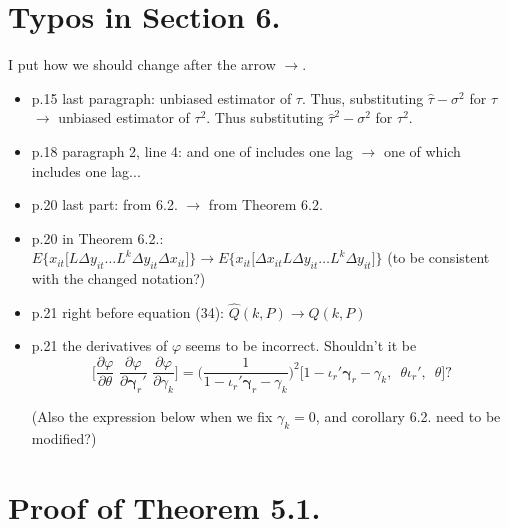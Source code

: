 \documentclass[11pt]{article}
\begin{document}



\doublespacing



\section*{Typos in Section 6.}

I put how we should change after the arrow $\rightarrow$. 

\begin{itemize}
\item p.15 last paragraph: unbiased estimator of $\tau$. Thus, substituting $\widehat{\tau}-\sigma^2$ for $\tau$ $\rightarrow$ unbiased estimator of $\tau^2$. Thus substituting $\widehat{\tau}^2-\sigma^2$ for $\tau^2$. 
\item p.18 paragraph 2, line 4: and one of includes one lag $\rightarrow$ one of which includes one lag...
\item p.20 last part: from 6.2. $\rightarrow$ from Theorem 6.2.
\item p.20 in Theorem 6.2.: $E\big\{ x_{it} \big[ L\Delta y_{it} \ldots L^k \Delta y_{it} \Delta x_{it} \big] \big \} \rightarrow E\big\{ x_{it} \big[ \Delta x_{it} L\Delta y_{it} \ldots L^k \Delta y_{it}  \big] \big \}$ (to be consistent with the changed notation?)
\item p.21 right before equation (34): $\widehat{Q}(k, P) \rightarrow Q(k,P)$
\item p.21 the derivatives of $\varphi$ seems to be incorrect. Shouldn't it be
\[
\bigg[\frac{\partial \varphi}{\partial \theta}\,\, \frac{\partial \varphi}{\partial \mathbf{\gamma}_r'}\,\, \frac{\partial \varphi}{\partial \gamma_k} \bigg] = \bigg(\frac{1}{1-\iota_r'\mathbf{\gamma}_r - \gamma_k }  \bigg)^2 \big [1-\iota_r'\mathbf{\gamma}_r - \gamma_k, \, \,\, \theta \iota_r',  \,\,\, \theta \big]?
\]

(Also the expression below when we fix $\gamma_k = 0$, and corollary 6.2. need to be modified?)
\end{itemize}


\section*{Proof of Theorem 5.1.}
\end{document}
